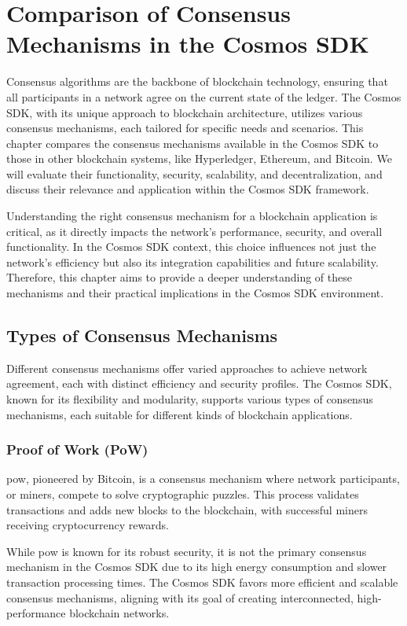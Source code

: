 \chapter{Comparison of Consensus Mechanisms in the Cosmos SDK}
\label{ch:compare}

Consensus algorithms are the backbone of blockchain technology, ensuring that all participants in a network agree on the current state of the ledger. The Cosmos SDK, with its unique approach to blockchain architecture, utilizes various consensus mechanisms, each tailored for specific needs and scenarios. This chapter compares the consensus mechanisms available in the Cosmos SDK to those in other blockchain systems, like Hyperledger, Ethereum, and Bitcoin. We will evaluate their functionality, security, scalability, and decentralization, and discuss their relevance and application within the Cosmos SDK framework.

Understanding the right consensus mechanism for a blockchain application is critical, as it directly impacts the network's performance, security, and overall functionality. In the Cosmos SDK context, this choice influences not just the network's efficiency but also its integration capabilities and future scalability. Therefore, this chapter aims to provide a deeper understanding of these mechanisms and their practical implications in the Cosmos SDK environment.

\section{Types of Consensus Mechanisms}

Different consensus mechanisms offer varied approaches to achieve network agreement, each with distinct efficiency and security profiles. The Cosmos SDK, known for its flexibility and modularity, supports various types of consensus mechanisms, each suitable for different kinds of blockchain applications.

\subsection{Proof of Work (PoW)}

\gls{pow}, pioneered by Bitcoin, is a consensus mechanism where network participants, or miners, compete to solve cryptographic puzzles. This process validates transactions and adds new blocks to the blockchain, with successful miners receiving cryptocurrency rewards.

While \gls{pow} is known for its robust security, it is not the primary consensus mechanism in the Cosmos SDK due to its high energy consumption and slower transaction processing times. The Cosmos SDK favors more efficient and scalable consensus mechanisms, aligning with its goal of creating interconnected, high-performance blockchain networks.

